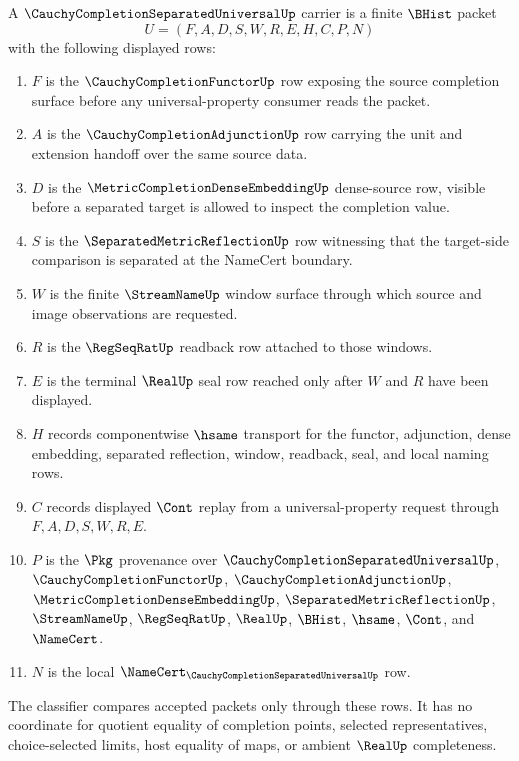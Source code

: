 \begin{definition}
\label{def:cauchy-completion-separated-universal-carrier}
A $\CauchyCompletionSeparatedUniversalUp$ carrier is a finite $\BHist$ packet
$$
U=(F,A,D,S,W,R,E,H,C,P,N)
$$
with the following displayed rows:
\begin{enumerate}
\item $F$ is the $\CauchyCompletionFunctorUp$ row exposing the source completion surface before any universal-property consumer reads the packet.
\item $A$ is the $\CauchyCompletionAdjunctionUp$ row carrying the unit and extension handoff over the same source data.
\item $D$ is the $\MetricCompletionDenseEmbeddingUp$ dense-source row, visible before a separated target is allowed to inspect the completion value.
\item $S$ is the $\SeparatedMetricReflectionUp$ row witnessing that the target-side comparison is separated at the NameCert boundary.
\item $W$ is the finite $\StreamNameUp$ window surface through which source and image observations are requested.
\item $R$ is the $\RegSeqRatUp$ readback row attached to those windows.
\item $E$ is the terminal $\RealUp$ seal row reached only after $W$ and $R$ have been displayed.
\item $H$ records componentwise $\hsame$ transport for the functor, adjunction, dense embedding, separated reflection, window, readback, seal, and local naming rows.
\item $C$ records displayed $\Cont$ replay from a universal-property request through $F,A,D,S,W,R,E$.
\item $P$ is the $\Pkg$ provenance over $\CauchyCompletionSeparatedUniversalUp$, $\CauchyCompletionFunctorUp$, $\CauchyCompletionAdjunctionUp$, $\MetricCompletionDenseEmbeddingUp$, $\SeparatedMetricReflectionUp$, $\StreamNameUp$, $\RegSeqRatUp$, $\RealUp$, $\BHist$, $\hsame$, $\Cont$, and $\NameCert$.
\item $N$ is the local $\NameCert_{\CauchyCompletionSeparatedUniversalUp}$ row.
\end{enumerate}
The classifier compares accepted packets only through these rows. It has no coordinate for quotient equality of completion points, selected representatives, choice-selected limits, host equality of maps, or ambient $\RealUp$ completeness.
\end{definition}

